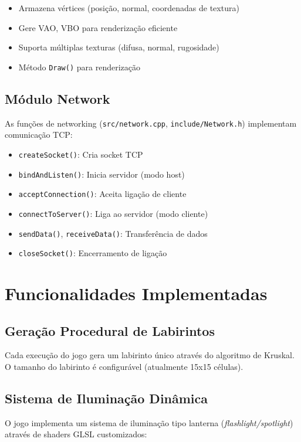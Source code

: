 \begin{itemize}
    \item Armazena vértices (posição, normal, coordenadas de textura)
    \item Gere VAO, VBO para renderização eficiente
    \item Suporta múltiplas texturas (difusa, normal, rugosidade)
    \item Método \texttt{Draw()} para renderização
\end{itemize}

\subsection{Módulo Network}
As funções de networking (\texttt{src/network.cpp}, \texttt{include/Network.h}) implementam comunicação TCP:

\begin{itemize}
    \item \texttt{createSocket()}: Cria socket TCP
    \item \texttt{bindAndListen()}: Inicia servidor (modo host)
    \item \texttt{acceptConnection()}: Aceita ligação de cliente
    \item \texttt{connectToServer()}: Liga ao servidor (modo cliente)
    \item \texttt{sendData()}, \texttt{receiveData()}: Transferência de dados
    \item \texttt{closeSocket()}: Encerramento de ligação
\end{itemize}

\section{Funcionalidades Implementadas} \label{sec:impl_funcionalidades}

\subsection{Geração Procedural de Labirintos}
Cada execução do jogo gera um labirinto único através do algoritmo de Kruskal. O tamanho do labirinto é configurável (atualmente 15x15 células).

\subsection{Sistema de Iluminação Dinâmica}
O jogo implementa um sistema de iluminação tipo lanterna (\textit{flashlight/spotlight}) através de shaders GLSL customizados:

